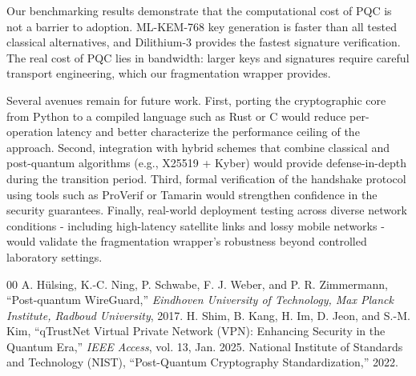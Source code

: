 \documentclass[10pt, conference, letterpaper]{IEEEtran}
\begin{document}
Our benchmarking results demonstrate that the computational cost of PQC is not a barrier to adoption. ML-KEM-768 key generation is faster than all tested classical alternatives, and Dilithium-3 provides the fastest signature verification. The real cost of PQC lies in bandwidth: larger keys and signatures require careful transport engineering, which our fragmentation wrapper provides.

Several avenues remain for future work. First, porting the cryptographic core from Python to a compiled language such as Rust or C would reduce per-operation latency and better characterize the performance ceiling of the approach. Second, integration with hybrid schemes that combine classical and post-quantum algorithms (e.g., X25519 + Kyber) would provide defense-in-depth during the transition period. Third, formal verification of the handshake protocol using tools such as ProVerif or Tamarin would strengthen confidence in the security guarantees. Finally, real-world deployment testing across diverse network conditions - including high-latency satellite links and lossy mobile networks - would validate the fragmentation wrapper's robustness beyond controlled laboratory settings.

\begin{thebibliography}{00}
 A. H\"ulsing, K.-C. Ning, P. Schwabe, F. J. Weber, and P. R. Zimmermann, ``Post-quantum WireGuard,'' \textit{Eindhoven University of Technology, Max Planck Institute, Radboud University}, 2017.
 H. Shim, B. Kang, H. Im, D. Jeon, and S.-M. Kim, ``qTrustNet Virtual Private Network (VPN): Enhancing Security in the Quantum Era,'' \textit{IEEE Access}, vol. 13, Jan. 2025. 
 National Institute of Standards and Technology (NIST), ``Post-Quantum Cryptography Standardization,'' 2022.
\end{thebibliography}
\end{document}
